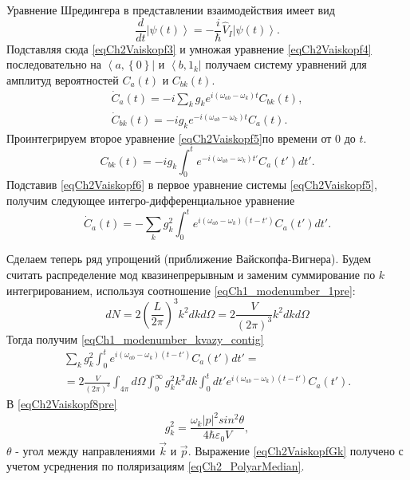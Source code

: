 Уравнение Шредингера в представлении взаимодействия имеет вид
\begin{equation}
\frac{d}{dt} \left|\psi\left(t\right)\right> =
- \frac{i}{\hbar} \hat{V}_I \left|\psi\left(t\right)\right>.
\label{eqCh2Vaiskopf4}
\end{equation}
Подставляя сюда \eqref{eqCh2Vaiskopf3} и умножая уравнение
\eqref{eqCh2Vaiskopf4} последовательно на
$\left<a, \left\{0\right\}\right|$ и $\left<b, 1_k\right|$ получаем
систему уравнений для амплитуд вероятностей 
$C_{a}\left(t\right)$ и $C_{bk}\left(t\right)$.
\begin{eqnarray}
\dot{C}_{a}\left(t\right) = - i \sum_{k} g_k e^{i \left(\omega_{ab} - 
  \omega_k\right)t} C_{bk}\left(t\right),
\nonumber \\
\dot{C}_{bk}\left(t\right) = - i g_k e^{- i \left(\omega_{ab} -
  \omega_k\right)t} C_{a}\left(t\right).
\label{eqCh2Vaiskopf5}
\end{eqnarray}
Проинтегрируем второе уравнение \eqref{eqCh2Vaiskopf5}по времени от $0$ до
$t$. 
\begin{equation}
C_{bk}\left(t\right) = - i g_k \int_0^{t} e^{- i \left(\omega_{ab} -
  \omega_k\right)t'} C_{a}\left(t'\right) dt'.
\label{eqCh2Vaiskopf6}
\end{equation}
Подставив \eqref{eqCh2Vaiskopf6} в первое уравнение системы
\eqref{eqCh2Vaiskopf5}, получим следующее интегро-дифференциальное
уравнение
\begin{equation}
\dot{C}_{a}\left(t\right) = - \sum_{k} g_k^2 
\int_0^t
e^{i \left(\omega_{ab} - \omega_k\right)\left(t - t'\right)}  
C_{a}\left(t'\right) dt'.
\label{eqCh2Vaiskopf7}
\end{equation}

Сделаем теперь ряд упрощений (приближение Вайскопфа-Вигнера). Будем
считать распределение мод квазинепрерывным и заменим суммирование по
$k$ интегрированием, используя соотношение
\eqref{eqCh1_modenumber_1pre}:
\begin{equation}
d N = 2 \left(\frac{L}{2 \pi} \right)^3 k^2 d k d \Omega = 
2 \frac{V}{\left(2 \pi\right)^3}  k^2 d k d \Omega
\nonumber
\end{equation}
Тогда получим \eqref{eqCh1_modenumber_kvazy_contig}
\begin{eqnarray}
\sum_{k} g_k^2 
\int_0^t
e^{i \left(\omega_{ab} - \omega_k\right)\left(t - t'\right)}  
C_{a}\left(t'\right) dt' = 
\nonumber \\
= 2 \frac{V}{\left(2 \pi\right)^3} \int_{4\pi}d \Omega \int_0^{\infty}
g_k^2 k^2 dk  \int_0^t dt'
e^{i \left(\omega_{ab} - \omega_k\right)\left(t - t'\right)}  
C_{a}\left(t'\right).
\label{eqCh2Vaiskopf8pre}
\end{eqnarray}
В \eqref{eqCh2Vaiskopf8pre} 
\begin{equation}
g_k^2 = \frac{\omega_k\left|p\right|^2 sin^2 \theta}{4 \hbar
  \varepsilon_0 V},
\label{eqCh2VaiskopfGk}
\end{equation}
$\theta$ - угол между направлениями $\vec{k}$ и $\vec{p}$.
Выражение \eqref{eqCh2VaiskopfGk} получено с учетом усреднения по
поляризациям \eqref{eqCh2_PolyarMedian}.

